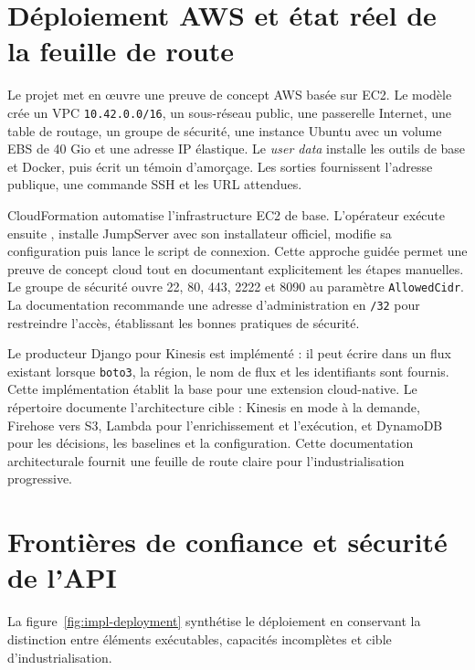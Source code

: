 \documentclass[11pt,a4paper,oneside]{report}
\theoremstyle{definition}
\theoremstyle{plain}
\begin{document}
\section{Déploiement AWS et état réel de la feuille de route}

Le projet met en œuvre une preuve de concept AWS basée sur EC2. Le modèle
 crée un VPC
\texttt{10.42.0.0/16}, un sous-réseau public, une passerelle Internet, une
table de routage, un groupe de sécurité, une instance Ubuntu avec un volume
EBS de 40 Gio et une adresse IP élastique. Le \emph{user data} installe les
outils de base et Docker, puis écrit un témoin d'amorçage. Les sorties
fournissent l'adresse publique, une commande SSH et les URL attendues.

CloudFormation automatise l'infrastructure EC2 de base. L'opérateur exécute
ensuite , installe JumpServer avec son
installateur officiel, modifie sa configuration puis lance le script de
connexion. Cette approche guidée permet une preuve de concept cloud tout en
documentant explicitement les étapes manuelles. Le groupe de sécurité ouvre
22, 80, 443, 2222 et 8090 au paramètre \texttt{AllowedCidr}. La documentation
recommande une adresse d'administration en \texttt{/32} pour restreindre
l'accès, établissant les bonnes pratiques de sécurité.

Le producteur Django pour Kinesis est implémenté : il peut écrire dans un flux
existant lorsque \texttt{boto3}, la région, le nom de flux et les identifiants
sont fournis. Cette implémentation établit la base pour une extension
cloud-native. Le répertoire  documente
l'architecture cible : Kinesis en mode à la demande, Firehose vers S3, Lambda
pour l'enrichissement et l'exécution, et DynamoDB pour les décisions, les
baselines et la configuration. Cette documentation architecturale fournit une
feuille de route claire pour l'industrialisation progressive.

\section{Frontières de confiance et sécurité de l'API}

La figure~\ref{fig:impl-deployment} synthétise le déploiement en conservant la
distinction entre éléments exécutables, capacités incomplètes et cible
d'industrialisation.
\end{document}
